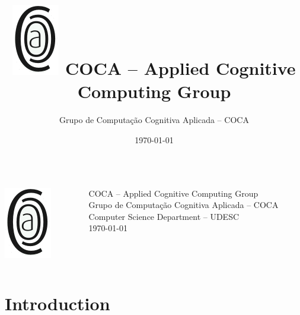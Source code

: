 \documentclass{beamer}
\title[Your Short Title]{ \includegraphics[scale=0.7]{logo_coca.jpg} \hspace{1cm}  COCA -- Applied Cognitive Computing Group}
\author{Grupo de Computação Cognitiva Aplicada -- COCA}
\institute{Computer Science Department -- UDESC}
\date{\today}
\begin{document}



\begin{frame}
\begin{columns}[T]

    \begin{column}{.3\textwidth}
     \begin{block}{}

    \includegraphics[scale=0.7]{logo_coca.jpg}
  
    \end{block}
    \end{column}
    \begin{column}{.7\textwidth}
    \begin{block}{}

    {\Large COCA -- Applied Cognitive Computing Group}\\
     {\large Grupo de Computação Cognitiva Aplicada -- COCA}\\
    {\large Computer Science Department -- UDESC}\\
     \today
    \end{block}
    \end{column}
  \end{columns}
\end{frame}






\section{Introduction}
\end{document}
